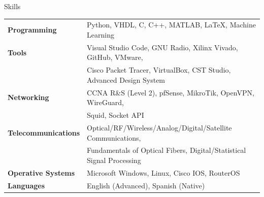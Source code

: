 \documentclass{resume} %
\begin{document}

\begin{rSection}{Skills}

    \begin{tabular}{ @{} >{\bfseries}l @{\hspace{6ex}} l }
        Programming        & Python, VHDL, C, C++, MATLAB, \LaTeX, Machine Learning                \\
        Tools              & Visual Studio Code, GNU Radio, Xilinx Vivado, GitHub, VMware,         \\
                           & Cisco Packet Tracer, VirtualBox, CST Studio, Advanced Design System   \\
        Networking         & CCNA R\&S (Level 2), pfSense, MikroTik, OpenVPN, WireGuard,           \\
                           & Squid, Socket API                                                     \\
        Telecommunications & Optical/RF/Wireless/Analog/Digital/Satellite Communications,          \\
                           & Fundamentals of Optical Fibers, Digital/Statistical Signal Processing \\
        Operative Systems  & Microsoft Windows, Linux, Cisco IOS, RouterOS                         \\
        Languages          & English (Advanced), Spanish (Native)
    \end{tabular}

\end{rSection}
\end{document}
